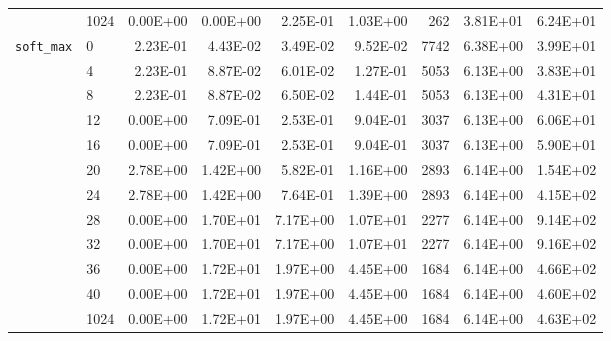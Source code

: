\begin{longtable}{llrrrrrrr}
         & 1024 &   0.00E+00 & 0.00E+00 & 2.25E-01 & 1.03E+00 &     262 &     3.81E+01 & 6.24E+01 \\
\texttt{soft\_max} & 0    &   2.23E-01 & 4.43E-02 & 3.49E-02 & 9.52E-02 &    7742 &     6.38E+00 & 3.99E+01 \\
         & 4    &   2.23E-01 & 8.87E-02 & 6.01E-02 & 1.27E-01 &    5053 &     6.13E+00 & 3.83E+01 \\
         & 8    &   2.23E-01 & 8.87E-02 & 6.50E-02 & 1.44E-01 &    5053 &     6.13E+00 & 4.31E+01 \\
         & 12   &   0.00E+00 & 7.09E-01 & 2.53E-01 & 9.04E-01 &    3037 &     6.13E+00 & 6.06E+01 \\
         & 16   &   0.00E+00 & 7.09E-01 & 2.53E-01 & 9.04E-01 &    3037 &     6.13E+00 & 5.90E+01 \\
         & 20   &   2.78E+00 & 1.42E+00 & 5.82E-01 & 1.16E+00 &    2893 &     6.14E+00 & 1.54E+02 \\
         & 24   &   2.78E+00 & 1.42E+00 & 7.64E-01 & 1.39E+00 &    2893 &     6.14E+00 & 4.15E+02 \\
         & 28   &   0.00E+00 & 1.70E+01 & 7.17E+00 & 1.07E+01 &    2277 &     6.14E+00 & 9.14E+02 \\
         & 32   &   0.00E+00 & 1.70E+01 & 7.17E+00 & 1.07E+01 &    2277 &     6.14E+00 & 9.16E+02 \\
         & 36   &   0.00E+00 & 1.72E+01 & 1.97E+00 & 4.45E+00 &    1684 &     6.14E+00 & 4.66E+02 \\
         & 40   &   0.00E+00 & 1.72E+01 & 1.97E+00 & 4.45E+00 &    1684 &     6.14E+00 & 4.60E+02 \\
         & 1024 &   0.00E+00 & 1.72E+01 & 1.97E+00 & 4.45E+00 &    1684 &     6.14E+00 & 4.63E+02 \\
\end{longtable}
